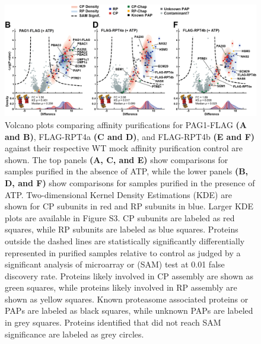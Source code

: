 \begin{figure}
	\ContinuedFloat
	\centering
	\includegraphics[width=\columnwidth]{Proteasome/Volcanosplit2.png}
	{Volcano plots comparing affinity purifications for PAG1-FLAG \textbf{(A and B)}, FLAG-RPT4a \textbf{(C and D)}, and FLAG-RPT4b \textbf{(E and F)} against their respective WT mock affinity purification control are shown. The top panels \textbf{(A, C, and E)} show comparisons for samples purified in the absence of ATP, while the lower panels \textbf{(B, D, and F)} show comparisons for samples purified in the presence of ATP. Two-dimensional Kernel Density Estimations (KDE) are shown for CP subunits in red and RP subunits in blue. Larger KDE plots are available in Figure S3. CP subunits are labeled as red squares, while RP subunits are labeled as blue squares. Proteins outside the dashed lines are statistically significantly differentially represented in purified samples relative to control as judged by a significant analysis of microarray or (SAM) test at 0.01 false discovery rate. Proteins likely involved in CP assembly are shown as green squares, while proteins likely involved in RP assembly are shown as yellow squares. Known proteasome associated proteins or PAPs are labeled as black squares, while unknown PAPs are labeled in grey squares. Proteins identified that did not reach SAM significance are labeled as grey circles.}
	\label{fig:volcanos2}
\end{figure}

